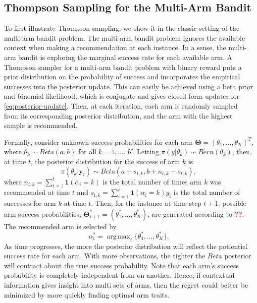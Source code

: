 \documentclass[12pt]{article}
\newcommand{\bred}[1]{\textbf{\textcolor{red}{#1}}}
\DeclareMathOperator*{\argmax}{\arg\!\max}
\begin{document}
\subsection{Thompson Sampling for the Multi-Arm Bandit}

To first illustrate Thompson sampling, we show it in the classic setting of the 
multi-arm bandit problem. 
The multi-arm bandit problem ignores the available context when making a 
recommendation at each instance.
In a sense, the multi-arm bandit is exploring the marginal success rate for each
available arm.
A Thompson sampler for a multi-arm bandit problem with binary reward puts a prior
distribution on the probability of success and incorporates the empirical successes
into the posterior update.
This can easily be achieved using a beta prior and binomial likelihood, which is
conjugate and gives closed form updates for \eqref{eq:posterior-update}.
Then, at each iteration, each arm is randomly sampled from its corresponding 
posterior distribution, and the arm with the highest sample is recommended.

Formally, consider unknown success probabilities for each arm 
$\bm{\Theta} = (\theta_1, \ldots, \theta_K)^T$,
where 
$\theta_k \sim Beta(a,b)$
for all $k = 1, \ldots, K$.
Letting 
$\pi(y \vert \theta_k) \sim Bern(\theta_k)$, 
then, at time $t$, the posterior distribution for the success of arm $k$ is
\begin{equation}
\pi(\theta_k \vert \bm{y}_t) \sim 
Beta(a + s_{t,k}, b + n_{t,k} - s_{t,k}),
\end{equation}
where 
$n_{t,k} = \sum_{i = 1}^{t} \bm{1}(\alpha_i = k)$
is the total number of times arm $k$ was recommended at time $t$
and
$s_{t,k} = \sum_{i = 1}^{t} \bm{1}(\alpha_i = k) y_i$ 
is the total number of successes for arm $k$ at time $t$.
Then, for the instance at time step $t + 1$, possible arm success probabilities,
$\bm{\Theta}_{t+1}^* = (\theta_1^*, \ldots, \theta_K^*)$,
are generated according to \bred{??}.
The recommended arm is selected by 
\begin{equation}
\alpha_t^* = \argmax_i \{\theta_1^*, \ldots, \theta_K^*\}.
\end{equation}
As time progresses, the more the posterior distribution will reflect the potiential 
success rate for each arm.
With more observations, the tighter the $Beta$ posterior will contract about the 
true success probability.
Note that each arm's success probability is completely independent from on another.
Hence, if contextual information gives insight into multi sets of arms, then the
regret could better be minimized by more quickly finding optimal arm traits.
\end{document}
